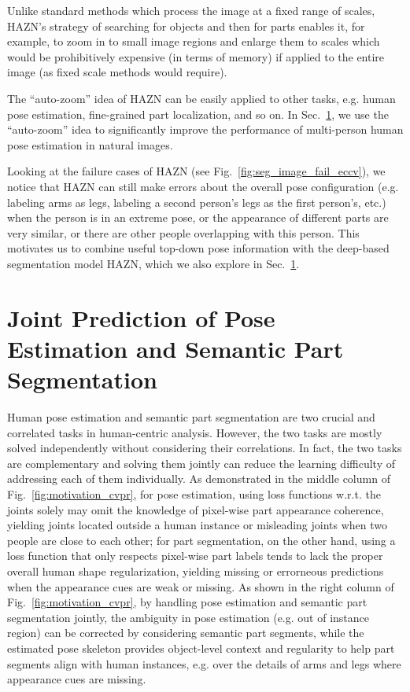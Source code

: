 Unlike standard methods which process the image at a fixed range of scales, HAZN’s strategy of searching for objects and then for parts enables it, for example, to zoom in to small image regions and enlarge them to scales which would be prohibitively expensive (in terms of memory) if applied to the entire image (as fixed scale methods would require).

The ``auto-zoom'' idea of HAZN can be easily applied to other tasks, e.g. human pose estimation, fine-grained part localization, and so on.
In Sec.~\ref{sec:pose_and_seg}, we use the ``auto-zoom'' idea to significantly improve the performance of multi-person human pose estimation in
natural images.

Looking at the failure cases of HAZN (see Fig.~\ref{fig:seg_image_fail_eccv}), we notice that HAZN can still make errors about the overall pose configuration (e.g. labeling arms as legs, labeling a second person’s legs as the first person’s, etc.) when the person is in an extreme pose,
or the appearance of different parts are very similar, or there are other people overlapping with this person.
This motivates us to combine useful top-down pose information with the deep-based segmentation model HAZN, which we also explore in Sec.~\ref{sec:pose_and_seg}.

\section{Joint Prediction of Pose Estimation and Semantic Part Segmentation}
\label{sec:pose_and_seg}
Human pose estimation and semantic part segmentation are two crucial and correlated tasks in human-centric analysis. However, the two tasks are mostly solved independently without considering their correlations.
In fact, the two tasks are complementary and solving them jointly can reduce the learning difficulty of addressing each of them individually. As demonstrated in the middle column of Fig.~\ref{fig:motivation_cvpr}, for pose estimation, using loss functions w.r.t. the joints solely may omit the knowledge of pixel-wise part appearance coherence, yielding joints located outside a human instance or misleading joints when two people are close to each other; for part segmentation, on the other hand, using a loss function that only respects pixel-wise part labels tends to lack the proper overall human shape regularization, yielding missing or errorneous predictions when the appearance cues are weak or missing. As shown in the right column of Fig.~\ref{fig:motivation_cvpr}, by handling pose estimation and semantic part segmentation jointly, the ambiguity in pose estimation (e.g. out of instance region) can be corrected by considering semantic part segments, while the estimated pose skeleton provides object-level context and regularity to help part segments align with human instances, e.g. over the details of arms and legs where appearance cues are missing.

